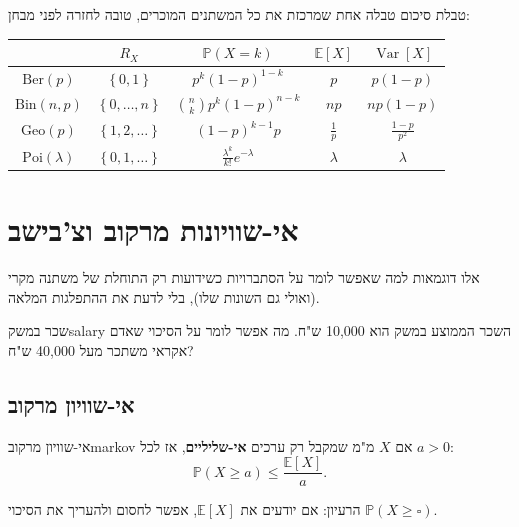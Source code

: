 \documentclass[11pt,a4paper]{report}
\newcommand{\set}[1]{\left\{#1\right\}}
\newcommand{\PP}{\mathbb{P}}
\newcommand{\E}{\mathbb{E}}
\DeclareMathOperator{\Var}{Var}
\newcommand{\Ber}{\mathrm{Ber}}
\newcommand{\Bin}{\mathrm{Bin}}
\newcommand{\Geo}{\mathrm{Geo}}
\newcommand{\Poi}{\mathrm{Poi}}
\begin{document}
\begin{suggestion}{טבלת סיכום}
טבלה אחת שמרכזת את כל המשתנים המוכרים, טובה לחזרה לפני מבחן:
\begin{center}
\renewcommand{\arraystretch}{1.6}
\begin{tabular}{c|c|c|c|c}
  & $R_X$ & $\PP(X=k)$ & $\E[X]$ & $\Var[X]$\\ \hline
  $\Ber(p)$ & $\set{0,1}$ & $p^k(1-p)^{1-k}$ & $p$ & $p(1-p)$\\
  $\Bin(n,p)$ & $\set{0,\dots,n}$ & $\binom nkp^k(1-p)^{n-k}$ & $np$ & $np(1-p)$\\
  $\Geo(p)$ & $\set{1,2,\dots}$ & $(1-p)^{k-1}p$ & $\frac1p$ & $\frac{1-p}{p^2}$\\
  $\Poi(\lambda)$ & $\set{0,1,\dots}$ & $\frac{\lambda^k}{k!}e^{-\lambda}$ & $\lambda$ & $\lambda$
\end{tabular}
\end{center}
\end{suggestion}

\chapter{אי-שוויונות מרקוב וצ'בישב}

אלו דוגמאות למה שאפשר לומר על הסתברויות כשידועות רק התוחלת של משתנה מקרי (ואולי גם השונות שלו), בלי לדעת את ההתפלגות המלאה.

\begin{example}{שכר במשק}{salary}
השכר הממוצע במשק הוא 10,000 ש"ח. מה אפשר לומר על הסיכוי שאדם אקראי משתכר מעל 40,000 ש"ח?
\end{example}

\section{אי-שוויון מרקוב}

\begin{theorem}{אי-שוויון מרקוב}{markov}
אם $X$ מ"מ שמקבל רק ערכים \textbf{אי-שליליים}, אז לכל $a>0$:
\[
  \PP(X\ge a)\le\frac{\E[X]}{a}.
\]
\end{theorem}

הרעיון: אם יודעים את $\E[X]$, אפשר לחסום ולהעריך את הסיכוי $\PP(X\ge\square)$.
\end{document}
